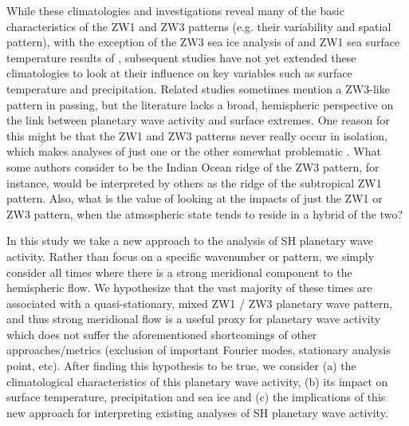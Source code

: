 While these climatologies and investigations reveal many of the basic characteristics of the ZW1 and ZW3 patterns (e.g. their variability and spatial pattern), with the exception of the ZW3 sea ice analysis of \citet{Raphael2007} and ZW1 sea surface temperature results of \citet{Hobbs2007}, subsequent studies have not yet extended these climatologies to look at their influence on key variables such as surface temperature and precipitation. Related studies \citep[e.g. of Australian rainfall variability;][]{Frederiksen2014} sometimes mention a ZW3-like pattern in passing, but the literature lacks a broad, hemispheric perspective on the link between planetary wave activity and surface extremes. One reason for this might be that the ZW1 and ZW3 patterns never really occur in isolation, which makes analyses of just one or the other somewhat problematic \citep{Hobbs2010}. What some authors consider to be the Indian Ocean ridge of the ZW3 pattern, for instance, would be interpreted by others \citep[e.g.][]{Hobbs2007} as the ridge of the subtropical ZW1 pattern. Also, what is the value of looking at the impacts of just the ZW1 or ZW3 pattern, when the atmospheric state tends to reside in a hybrid of the two? 

In this study we take a new approach to the analysis of SH planetary wave activity. Rather than focus on a specific wavenumber or pattern, we simply consider all times where there is a strong meridional component to the hemispheric flow. We hypothesize that the vast majority of these times are associated with a quasi-stationary, mixed ZW1 / ZW3 planetary wave pattern, and thus strong meridional flow is a useful proxy for planetary wave activity which does not suffer the aforementioned shortcomings of other approaches/metrics (exclusion of important Fourier modes, stationary analysis point, etc). After finding this hypothesis to be true, we consider (a) the climatological characteristics of this planetary wave activity, (b) its impact on surface temperature, precipitation and sea ice and (c) the implications of this new approach for interpreting existing analyses of SH planetary wave activity.